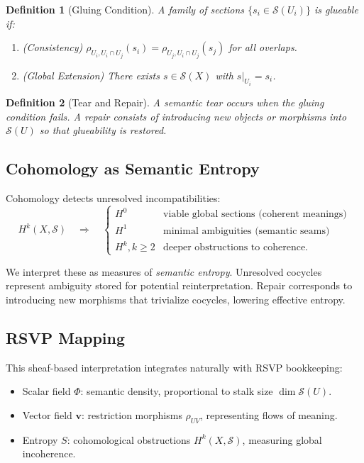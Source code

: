 \documentclass{article}
\newtheorem{definition}{Definition}
\begin{document}
\begin{definition}[Gluing Condition]
A family of sections $\{s_i \in \mathcal{S}(U_i)\}$ is \emph{glueable} if:
\begin{enumerate}
  \item (Consistency) $\rho_{U_i,U_i \cap U_j}(s_i) = \rho_{U_j,U_i \cap U_j}(s_j)$ for all overlaps.
  \item (Global Extension) There exists $s \in \mathcal{S}(X)$ with $s|_{U_i} = s_i$.
\end{enumerate}
\end{definition}

\begin{definition}[Tear and Repair]
A \emph{semantic tear} occurs when the gluing condition fails. 
A \emph{repair} consists of introducing new objects or morphisms into $\mathcal{S}(U)$ so that glueability is restored.
\end{definition}

\subsection{Cohomology as Semantic Entropy}

Cohomology detects unresolved incompatibilities:
\[
H^k(X,\mathcal{S}) \quad \Rightarrow \quad
\begin{cases}
H^0 & \text{viable global sections (coherent meanings)} \\
H^1 & \text{minimal ambiguities (semantic seams)} \\
H^k, k \geq 2 & \text{deeper obstructions to coherence.}
\end{cases}
\]

We interpret these as measures of \emph{semantic entropy}. 
Unresolved cocycles represent ambiguity stored for potential reinterpretation. 
Repair corresponds to introducing new morphisms that trivialize cocycles, lowering effective entropy.

\subsection{RSVP Mapping}

This sheaf-based interpretation integrates naturally with RSVP bookkeeping:
\begin{itemize}
  \item Scalar field $\Phi$: semantic density, proportional to stalk size $\dim \mathcal{S}(U)$.
  \item Vector field $\mathbf{v}$: restriction morphisms $\rho_{UV}$, representing flows of meaning.
  \item Entropy $S$: cohomological obstructions $H^k(X,\mathcal{S})$, measuring global incoherence.
\end{itemize}
\end{document}
